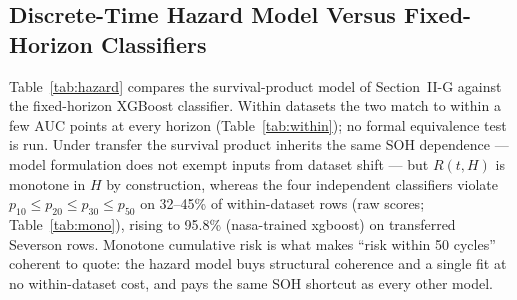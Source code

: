 \documentclass[preprint,12pt]{elsarticle}
\begin{document}
\begin{table}[!t]
\caption{Same-Chemistry Cross-Laboratory Controls at H=20 (XGBoost, Pooled AUC [CI]). Full Feature Sets Exercise the Zero-Imputation Confound; Common Sets Restrict Both Datasets to the Shared Four-Feature Subset.}
\label{tab:samechem}
\centering
{}
\end{table}

\subsection{Discrete-Time Hazard Model Versus Fixed-Horizon Classifiers}
Table~\ref{tab:hazard} compares the survival-product model of Section~II-G against the fixed-horizon XGBoost classifier. Within datasets the two match to within a few AUC points at every horizon (Table~\ref{tab:within}); no formal equivalence test is run. Under transfer the survival product inherits the same SOH dependence --- model formulation does not exempt inputs from dataset shift --- but $R(t,H)$ is monotone in $H$ by construction, whereas the four independent classifiers violate $p_{10}\le p_{20}\le p_{30}\le p_{50}$ on 32--45\% of within-dataset rows (raw scores; Table~\ref{tab:mono}), rising to 95.8\% (nasa-trained xgboost) on transferred Severson rows. Monotone cumulative risk is what makes ``risk within 50 cycles'' coherent to quote: the hazard model buys structural coherence and a single fit at no within-dataset cost, and pays the same SOH shortcut as every other model.
\end{document}
